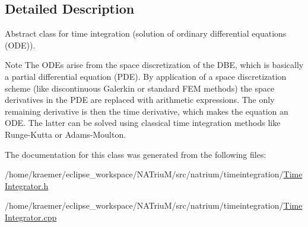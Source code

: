 \subsection{Detailed Description}
Abstract class for time integration (solution of ordinary differential equations (O\-D\-E)). 

\begin{DoxyNote}{Note}
The O\-D\-Es arise from the space discretization of the D\-B\-E, which is basically a partial differential equation (P\-D\-E). By application of a space discretization scheme (like discontinuous Galerkin or standard F\-E\-M methods) the space derivatives in the P\-D\-E are replaced with arithmetic expressions. The only remaining derivative is then the time derivative, which makes the equation an O\-D\-E. The latter can be solved using classical time integration methods like Runge-\/\-Kutta or Adams-\/\-Moulton. 
\end{DoxyNote}


The documentation for this class was generated from the following files\-:\begin{DoxyCompactItemize}
\item 
/home/kraemer/eclipse\-\_\-workspace/\-N\-A\-Triu\-M/src/natrium/timeintegration/\hyperlink{TimeIntegrator_8h}{Time\-Integrator.\-h}\item 
/home/kraemer/eclipse\-\_\-workspace/\-N\-A\-Triu\-M/src/natrium/timeintegration/\hyperlink{TimeIntegrator_8cpp}{Time\-Integrator.\-cpp}\end{DoxyCompactItemize}
